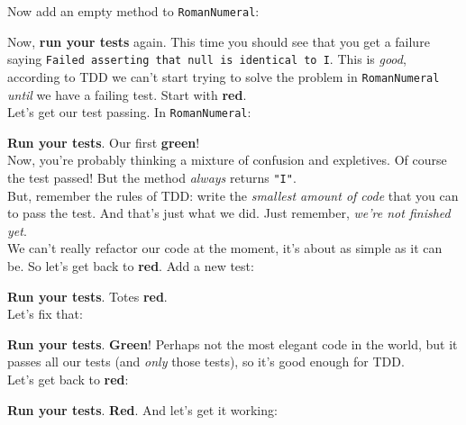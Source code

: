 Now add an empty method to \texttt{RomanNumeral}:


Now, \textbf{run your tests} again. This time you should see that you get a failure saying \texttt{Failed asserting that null is identical to \textquotesingle{}I\textquotesingle{}}. This is \textit{good}, according to TDD we can't start trying to solve the problem in \texttt{RomanNumeral} \textit{until} we have a failing test. Start with \textbf{red}.
\\

Let's get our test passing. In \texttt{RomanNumeral}:


\textbf{Run your tests}. Our first \textbf{green}!
\\

Now, you're probably thinking a mixture of confusion and expletives. Of course the test passed! But the method \textit{always} returns \texttt{"I"}.
\\

But, remember the rules of TDD: write the \textit{smallest amount of code} that you can to pass the test. And that's just what we did. Just remember, \textit{we're not finished yet}.
\\

We can't really refactor our code at the moment, it's about as simple as it can be. So let's get back to \textbf{red}. Add a new test:


\textbf{Run your tests}. Totes \textbf{red}.
\\

Let's fix that:


\textbf{Run your tests}. \textbf{Green}! Perhaps not the most elegant code in the world, but it passes all our tests (and \textit{only} those tests), so it's good enough for TDD.
\\

Let's get back to \textbf{red}:



\pagebreak

\textbf{Run your tests}. \textbf{Red}. And let's get it working:


